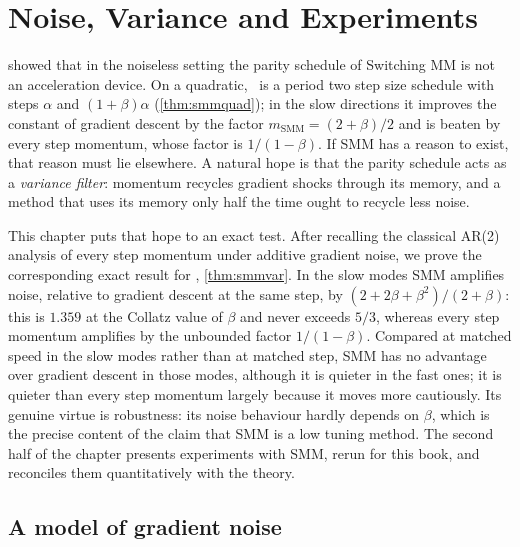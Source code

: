 \chapter{Noise, Variance and Experiments}\label{chap:noise}

 showed that in the noiseless setting the parity schedule of
Switching MM is not an acceleration device. On a quadratic, \smmdet\ is a
period two step size schedule with steps $\alpha$ and $(1+\beta)\alpha$
(\cref{thm:smmquad}); in the slow directions it improves the constant of
gradient descent by the factor $m_{\mathrm{SMM}}=(2+\beta)/2$ and is beaten by
every step momentum, whose factor is $1/(1-\beta)$. If SMM has a reason to
exist, that reason must lie elsewhere.
A natural hope is that the parity schedule acts as a \emph{variance filter}: momentum recycles gradient shocks through its memory, and a method that uses its memory only half the time ought to recycle less noise.

This chapter puts that hope to an exact test. After recalling the classical
AR(2) analysis of every step momentum under additive gradient noise, we prove
the corresponding exact result for \smmdet, \cref{thm:smmvar}. In the slow
modes SMM amplifies noise, relative to gradient descent at the same step, by
$(2+2\beta+\beta^2)/(2+\beta)$: this is $1.359$ at the Collatz value of
$\beta$ and never exceeds $5/3$, whereas every step momentum amplifies by the
unbounded factor $1/(1-\beta)$.
Compared at matched speed in the slow modes rather than at matched step, SMM has no advantage over gradient descent in those modes, although it is quieter in the fast ones; it is quieter than every step momentum largely because it moves more cautiously.
Its genuine
virtue is robustness: its noise behaviour hardly depends on $\beta$, which is
the precise content of the claim that SMM is a low tuning method.
The second half of the chapter presents experiments with SMM, rerun for this book, and reconciles them quantitatively with the theory.

\section{A model of gradient noise}\label{sec:ch7:model}

